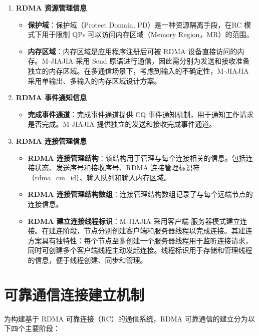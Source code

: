 {\begin{enumerate}[label=\arabic*., leftmargin=1em, align=left]
        \item \textbf{RDMA 资源管理信息}
              \begin{itemize}
                  \item \textbf{保护域}：保护域（Protect Domain, PD）是一种资源隔离手段，在RC 模式下用于限制 QPs 可以访问内存区域（Memory Region，MR）的范围。
                  \item \textbf{内存区域}：内存区域是应用程序注册后可被 RDMA 设备直接访问的内存。M-JIAJIA 采用 Send 原语进行通信，因此需分别为发送和接收准备独立的内存区域。在多通信场景下，考虑到输入的不确定性，M-JIAJIA 采用单输出、多输入的内存区域设计方案。
              \end{itemize}

        \item \textbf{RDMA 事件通知信息}
              \begin{itemize}
                  \item \textbf{完成事件通道}：完成事件通道提供 CQ 事件通知机制，用于通知工作请求是否完成。M-JIAJIA 提供独立的发送和接收完成事件通道。
              \end{itemize}

        \item \textbf{RDMA 连接管理信息}
              \begin{itemize}
                  \item \textbf{RDMA 连接管理结构}：该结构用于管理与每个连接相关的信息。包括连接状态、发送序号和接收序号、RDMA 连接管理标识符（rdma\_cm\_id）、输入队列和输入内存区域。
                  \item \textbf{RDMA 连接管理结构数组}：连接管理结构数组记录了与每个远端节点的连接信息。
                  \item \textbf{RDMA 建立连接线程标识}：M-JIAJIA 采用客户端-服务器模式建立连接。在建连阶段，节点分别创建客户端和服务器线程以完成连接。其建连方案具有独特性：每个节点至多创建一个服务器线程用于监听连接请求，同时可创建多个客户端线程主动发起连接。线程标识用于存储和管理线程的信息，便于线程创建、同步和管理。
              \end{itemize}
    \end{enumerate}

    \section{可靠通信连接建立机制}\label{sec:可靠通信连接建立机制}

    为构建基于 RDMA 可靠连接（RC）的通信系统，RDMA 可靠通信的建立分为以下四个主要阶段：

}
